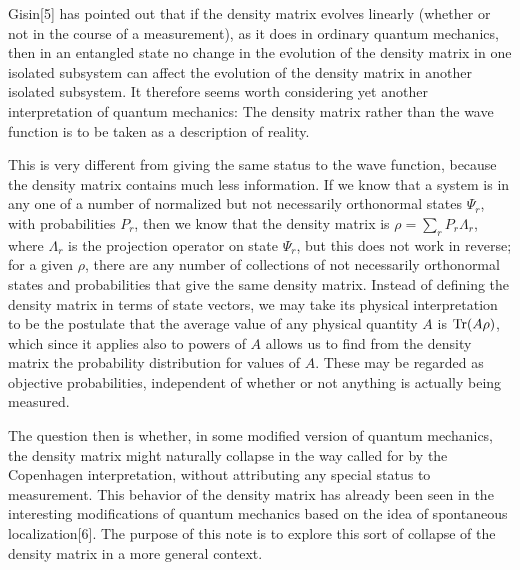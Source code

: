 Gisin[5] has pointed out that if the density matrix evolves linearly (whether or not in the course of a measurement), as it does in ordinary quantum mechanics, then in an entangled state no change in the evolution of the density matrix in one isolated subsystem can affect the evolution of the density matrix in another isolated subsystem.  It therefore seems worth considering yet another interpretation of quantum mechanics:  The density matrix rather than the wave function  is to be taken as a description of reality.  

This is very different from giving the same status to the wave function, because the density matrix contains much less information.    If we know that a system is in any one of a number of normalized but not necessarily orthonormal states $\Psi_r$, with  probabilities $P_r$, then we know that the density matrix is $\rho=\sum_r P_r\Lambda_r$, where $\Lambda_r$ is the projection operator on state  
$\Psi_r$, but this does not work in reverse; for a given $\rho$, there are any number of collections of not necessarily orthonormal states and probabilities that give the same density matrix.  Instead of defining the density matrix in terms of state vectors, we may take its physical interpretation to be the postulate that the average value of any physical quantity $A$ is ${\rm Tr}(A\rho)$, which since it applies also to powers of $A$ allows us to find from the density matrix the probability distribution  for values of $A$.  These may be regarded as objective probabilities, independent of whether or not anything is actually being measured.  

The question then is whether, in some modified version of quantum mechanics, the density matrix might naturally collapse in the way called for by the Copenhagen interpretation, without attributing any special status to measurement.  This behavior of the density matrix has already been seen in the interesting modifications of quantum mechanics based on the idea of spontaneous localization[6].  The purpose of this note is to explore this sort of collapse of the density matrix in a more general context.



